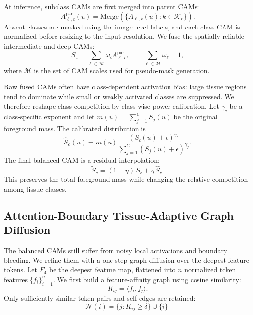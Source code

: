 At inference, subclass CAMs are first merged into parent CAMs:
\begin{equation}
    A_{\ell,c}^{\mathrm{par}}(u)
    =
    \mathrm{Merge}\left(
    \{A_{\ell,k}(u): k \in \mathcal{K}_c\}
    \right).
\end{equation}
Absent classes are masked using the image-level labels, and each class CAM is normalized before resizing to the input resolution. We fuse the spatially reliable intermediate and deep CAMs:
\begin{equation}
    S_c
    =
    \sum_{\ell \in \mathcal{M}}
    \omega_{\ell} A_{\ell,c}^{\mathrm{par}},
    \qquad
    \sum_{\ell \in \mathcal{M}}\omega_{\ell}=1,
    \label{eq:cam_fusion}
\end{equation}
where $\mathcal{M}$ is the set of CAM scales used for pseudo-mask generation.

Raw fused CAMs often have class-dependent activation bias: large tissue regions tend to dominate while small or weakly activated classes are suppressed. We therefore reshape class competition by class-wise power calibration. Let $\gamma_c$ be a class-specific exponent and let $m(u)=\sum_{j=1}^{C} S_j(u)$ be the original foreground mass. The calibrated distribution is
\begin{equation}
    \widehat{S}_c(u)
    =
    m(u)
    \frac{
        \left(S_c(u)+\epsilon\right)^{\gamma_c}
    }{
        \sum_{j=1}^{C}
        \left(S_j(u)+\epsilon\right)^{\gamma_j}
    } .
    \label{eq:power_calibration}
\end{equation}
The final balanced CAM is a residual interpolation:
\begin{equation}
    \widetilde{S}_c
    =
    (1-\eta)\,S_c + \eta\,\widehat{S}_c .
    \label{eq:activation_balance}
\end{equation}
This preserves the total foreground mass while changing the relative competition among tissue classes.

\subsection{Attention-Boundary Tissue-Adaptive Graph Diffusion}
\label{subsec:abtagd}

The balanced CAMs still suffer from noisy local activations and boundary bleeding. We refine them with a one-step graph diffusion over the deepest feature tokens. Let $F_4$ be the deepest feature map, flattened into $n$ normalized token features $\{f_i\}_{i=1}^{n}$. We first build a feature-affinity graph using cosine similarity:
\begin{equation}
    K_{ij} = \langle f_i, f_j \rangle .
\end{equation}
Only sufficiently similar token pairs and self-edges are retained:
\begin{equation}
    \mathcal{N}(i)
    =
    \{j : K_{ij} \geq \delta\} \cup \{i\}.
\end{equation}

